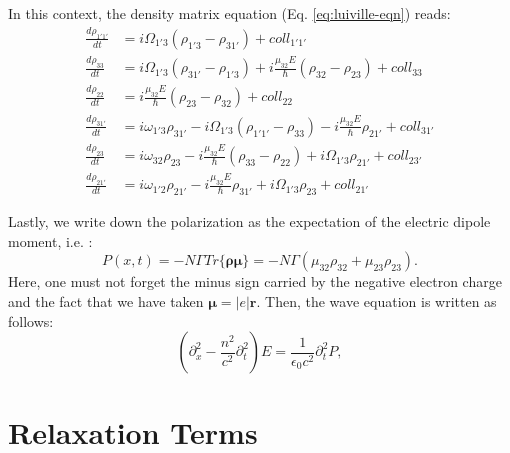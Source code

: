 \documentclass[10pt,english,fleqn]{article}%
\newcommand{\mb}[1]{\bm{#1}}
\begin{document}
In this context, the density matrix equation (Eq. \ref{eq:luiville-eqn}) reads: 
\begin{align}
\frac{d \rho_{1'1'}}{d t} &= i\Omega_{1'3} (\rho_{1'3} - \rho_{31'}) + coll_{1'1'} \\ 
\frac{d \rho_{33}}{d t}   &= i\Omega_{1'3} (\rho_{31'} - \rho_{1'3}) + i\frac{\mu_{32} E}{\hbar} (\rho_{32}-\rho_{23}) + coll_{33} \\
\frac{d \rho_{22}}{d t}   &= i\frac{\mu_{32} E}{\hbar} (\rho_{23}-\rho_{32}) + coll_{22} \\
\frac{d \rho_{31'}}{d t}  &= i\omega_{1'3}\rho_{31'} -i \Omega_{1'3}(\rho_{1'1'} - \rho_{33}) -i\frac{\mu_{32}E}{\hbar}\rho_{21'} +coll_{31'}  \\
\frac{d \rho_{23}}{d t}   &= i\omega_{32}\rho_{23} -i \frac{\mu_{32}E}{\hbar}(\rho_{33}-\rho_{22}) +i\Omega_{1'3}\rho_{21'} +coll_{23'}  \\
\frac{d \rho_{21'}}{d t}  &= i\omega_{1'2}\rho_{21'} -i\frac{\mu_{32}E}{\hbar}\rho_{31'} +i\Omega_{1'3}\rho_{23} +coll_{21'} 
\end{align}

Lastly, we write down the polarization as the expectation of the electric dipole moment, i.e. :
\begin{equation} P(x,t) = -N\Gamma Tr\{\mb\rho \mb\mu\} = -N\Gamma(\mu_{32}\rho_{32} + \mu_{23}\rho_{23}).\end{equation} Here,
one must not forget the minus sign carried by the negative electron charge and the fact that we have taken $\mb{\mu} = |e|\mb{r}$.
Then, the wave equation is written as follows:
\begin{equation}
(\partial^2_{x} -\frac{n^2}{c^2}\partial^2_t) E = \frac{1}{\epsilon_0 c^2}\partial^2_t P,
\end{equation}

\section{Relaxation Terms}
\label{sec:relaxation-terms}
\end{document}
